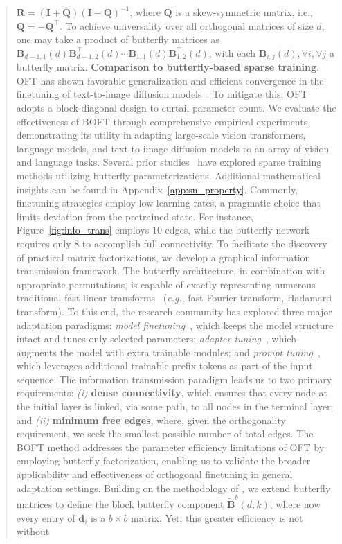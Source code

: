 \begin{abstract}
$\bm{R}=(\bm{I}+\bm{Q})(\bm{I}-\bm{Q})^{-1}$, where $\bm{Q}$ is a skew-symmetric matrix, i.e., $\bm{Q}=-\bm{Q}^\top$. To achieve universality over all orthogonal matrices of size $d$, one may take a product of butterfly matrices as $\bm{B}_{d-1,1}(d)\bm{B}^\top_{d-1,2}(d)\cdots\bm{B}_{1,1}(d)\bm{B}^\top_{1,2}(d)$, with each $\bm{B}_{i,j}(d),\forall i,\forall j$ a butterfly matrix. \textbf{Comparison to butterfly-based sparse training}. OFT has shown favorable generalization and efficient convergence in the finetuning of text-to-image diffusion models~\cite{qiu2023controlling}. To mitigate this, OFT adopts a block-diagonal design to curtail parameter count. We evaluate the effectiveness of BOFT through comprehensive empirical experiments, demonstrating its utility in adapting large-scale vision transformers, language models, and text-to-image diffusion models to an array of vision and language tasks. Several prior studies~\cite{dao2019learning,dao2019kaleidoscope,chen2022pixelated,dao2022monarch} have explored sparse training methods utilizing butterfly parameterizations. Additional mathematical insights can be found in Appendix~\ref{app:sn_property}. Commonly, finetuning strategies employ low learning rates, a pragmatic choice that limits deviation from the pretrained state. For instance, Figure~\ref{fig:info_trans} employs $10$ edges, while the butterfly network requires only $8$ to accomplish full connectivity. To facilitate the discovery of practical matrix factorizations, we develop a graphical information transmission framework. The butterfly architecture, in combination with appropriate permutations, is capable of exactly representing numerous traditional fast linear transforms~\cite{dao2019learning,dao2019kaleidoscope} (\emph{e.g.}, fast Fourier transform, Hadamard transform). To this end, the research community has explored three major adaptation paradigms: \emph{model finetuning}~\cite{hulora2022,zaken2022bitfit,guo2020parameter,raffel2020exploring,qiu2023controlling,zhang2022adaptive,chavan2023one}, which keeps the model structure intact and tunes only selected parameters; \emph{adapter tuning}~\cite{rebuffi2017learning,houlsby2019parameter,pfeiffer2020adapterfusion,lin2020exploring,he2021towards}, which augments the model with extra trainable modules; and \emph{prompt tuning}~\cite{li2021prefix,lester2021power}, which leverages additional trainable prefix tokens as part of the input sequence. The information transmission paradigm leads us to two primary requirements: \emph{(i)} \textbf{dense connectivity}, which ensures that every node at the initial layer is linked, via some path, to all nodes in the terminal layer; and \emph{(ii)} \textbf{minimum free edges}, where, given the orthogonality requirement, we seek the smallest possible number of total edges. The BOFT method addresses the parameter efficiency limitations of OFT by employing butterfly factorization, enabling us to validate the broader applicability and effectiveness of orthogonal finetuning in general adaptation settings. Building on the methodology of \cite{chen2022pixelated}, we extend butterfly matrices to define the block butterfly component $\tilde{\bm{B}}^b(d,k)$, where now every entry of $\bm{d}_i$ is a $b\times b$ matrix. Yet, this greater efficiency is not without 
\end{abstract}

